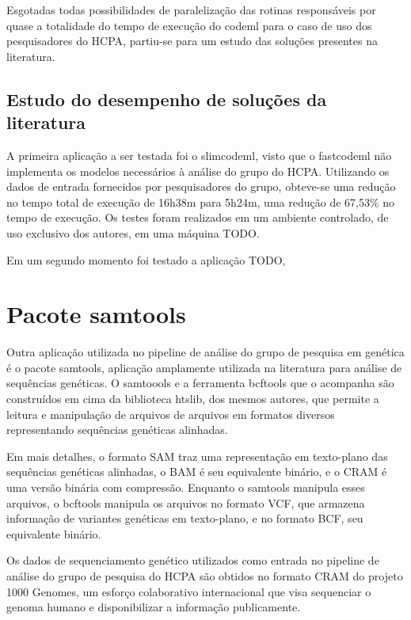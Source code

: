 \documentclass[cic,tc]{iiufrgs}
\begin{document}
Esgotadas todas possibilidades de paralelização das rotinas responsáveis por
quase a totalidade do tempo de execução do codeml para o caso de uso dos
pesquisadores do HCPA, partiu-se para um estudo das soluções presentes na
literatura.

\subsection{Estudo do desempenho de soluções da literatura}

A primeira aplicação a ser testada foi o
slimcodeml,\cite{schabauer2012slimcodeml} visto que o
fastcodeml\cite{valle2014optimization} não implementa os modelos necessários à
análise do grupo do HCPA. Utilizando os dados de entrada fornecidos por
pesquisadores do grupo, obteve-se uma redução no tempo total de execução de
16h38m para 5h24m, uma redução de 67,53\% no tempo de execução. Os testes foram
realizados em um ambiente controlado, de uso exclusivo dos autores, em uma
máquina TODO.

Em um segundo momento foi testado a aplicação TODO,\cite{maldonado2016lmap}

\section{Pacote samtools}

Outra aplicação utilizada no pipeline de análise do grupo de pesquisa em
genética é o pacote samtools,\cite{li2009sequence} aplicação amplamente
utilizada na literatura para análise de sequências
genéticas.\cite{danecek2021twelve} O samtoools e a ferramenta bcftools que o
acompanha são construídos em cima da biblioteca htslib, dos mesmos autores, que
permite a leitura e manipulação de arquivos de arquivos em formatos diversos
representando sequências genéticas alinhadas.\cite{danecek2021twelve}

Em mais detalhes, o formato SAM traz uma representação em texto-plano das
sequências genéticas alinhadas, o BAM é seu equivalente binário, e o CRAM é uma
versão binária com compressão. Enquanto o samtools manipula esses arquivos, o
bcftools manipula os arquivos no formato VCF, que armazena informação de
variantes genéticas em texto-plano, e no formato BCF, seu equivalente
binário.\cite{danecek2021twelve}

Os dados de sequenciamento genético utilizados como entrada no pipeline de
análise do grupo de pesquisa do HCPA são obtidos no formato CRAM do projeto
1000 Genomes, um esforço colaborativo internacional que visa sequenciar o
genoma humano e disponibilizar a informação publicamente.\cite{via20101000}
\end{document}

